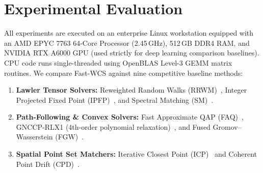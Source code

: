 \documentclass[a4paper,fleqn]{cas-dc}
\theoremstyle{thmstyleone}
\theoremstyle{thmstyletwo}
\theoremstyle{thmstylethree}
\begin{document}
\section{Experimental Evaluation}
\label{sec:experiments}

All experiments are executed on an enterprise Linux workstation equipped with an AMD EPYC 7763 64-Core Processor (2.45\,GHz), 512\,GB DDR4 RAM, and NVIDIA RTX A6000 GPU (used strictly for deep learning comparison baselines). CPU code runs single-threaded using OpenBLAS Level-3 GEMM matrix routines. We compare Fast-WCS against nine competitive baseline methods:
\begin{enumerate}
    \item \textbf{Lawler Tensor Solvers:} Reweighted Random Walks (RRWM)~\cite{cho2010rrwm}, Integer Projected Fixed Point (IPFP)~\cite{leordeanu2009ipfp}, and Spectral Matching (SM)~\cite{leordeanu2005}.
    \item \textbf{Path-Following \& Convex Solvers:} Fast Approximate QAP (FAQ)~\cite{vogelstein2015fast}, GNCCP-RLX1 (4th-order polynomial relaxation)~\cite{yang2018algorithm}, and Fused Gromov--Wasserstein (FGW)~\cite{titouan2019optimal}.
    \item \textbf{Spatial Point Set Matchers:} Iterative Closest Point (ICP)~\cite{besl1992icp} and Coherent Point Drift (CPD)~\cite{myronenko2010cpd}.
\end{enumerate}
\end{document}
